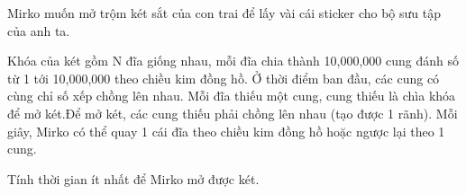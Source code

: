 Mirko muốn mở trộm két sắt của con trai để lấy vài cái sticker cho  bộ sưu tập của anh ta.  

   Khóa của két gồm N đĩa giống nhau, mỗi đĩa chia thành 10,000,000 cung đánh số từ 1 tới 10,000,000 theo chiều kim đồng hồ. Ở thời điểm ban  đầu, các cung có cùng chỉ số xếp chồng lên nhau. Mỗi đĩa thiếu một cung, cung thiếu là chìa khóa để mở két.Để mở két, các cung thiếu phải chồng lên nhau (tạo được 1 rãnh). Mỗi giây, Mirko có thể quay 1 cái đĩa theo chiều kim đồng hồ hoặc ngược lại theo 1 cung.  

   Tính thời gian ít nhất để Mirko mở được két.